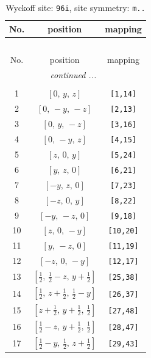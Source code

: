 \documentclass[fleqn,8pt]{jsarticle}
\begin{document}
\begin{longtable}{ccc}
\caption{Wyckoff site: {\tt 96i}, site symmetry: {\tt m..}}
 \\
 \hline \hline
No. & position & mapping \\ \hline \endfirsthead

\multicolumn{2}{l}{\tablename\ \thetable{}} \\
 \hline \hline
No. & position & mapping \\ \hline \endhead

 \hline \hline
\multicolumn{2}{r}{\footnotesize\it continued ...} \\ \endfoot

 \hline \hline
\multicolumn{2}{r}{} \\ \endlastfoot

1 & $\left[ 0,\, y,\, z \right]$ & {\tt [1,14]} \\ \hline
2 & $\left[ 0,\, - y,\, - z \right]$ & {\tt [2,13]} \\ \hline
3 & $\left[ 0,\, y,\, - z \right]$ & {\tt [3,16]} \\ \hline
4 & $\left[ 0,\, - y,\, z \right]$ & {\tt [4,15]} \\ \hline
5 & $\left[ z,\, 0,\, y \right]$ & {\tt [5,24]} \\ \hline
6 & $\left[ y,\, z,\, 0 \right]$ & {\tt [6,21]} \\ \hline
7 & $\left[ - y,\, z,\, 0 \right]$ & {\tt [7,23]} \\ \hline
8 & $\left[ - z,\, 0,\, y \right]$ & {\tt [8,22]} \\ \hline
9 & $\left[ - y,\, - z,\, 0 \right]$ & {\tt [9,18]} \\ \hline
10 & $\left[ z,\, 0,\, - y \right]$ & {\tt [10,20]} \\ \hline
11 & $\left[ y,\, - z,\, 0 \right]$ & {\tt [11,19]} \\ \hline
12 & $\left[ - z,\, 0,\, - y \right]$ & {\tt [12,17]} \\ \hline
13 & $\left[ \frac{1}{2},\, \frac{1}{2} - z,\, y + \frac{1}{2} \right]$ & {\tt [25,38]} \\ \hline
14 & $\left[ \frac{1}{2},\, z + \frac{1}{2},\, \frac{1}{2} - y \right]$ & {\tt [26,37]} \\ \hline
15 & $\left[ z + \frac{1}{2},\, y + \frac{1}{2},\, \frac{1}{2} \right]$ & {\tt [27,48]} \\ \hline
16 & $\left[ \frac{1}{2} - z,\, y + \frac{1}{2},\, \frac{1}{2} \right]$ & {\tt [28,47]} \\ \hline
17 & $\left[ \frac{1}{2} - y,\, \frac{1}{2},\, z + \frac{1}{2} \right]$ & {\tt [29,43]} \\ \hline

\end{longtable}
\end{document}
